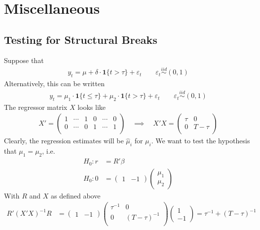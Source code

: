 \documentclass[12pt]{article}
\theoremstyle{plain}
\theoremstyle{definition}
\theoremstyle{remark}
\newcommand{\iid}{\overset{iid}{\sim}}
\begin{document}
\clearpage
\section{Miscellaneous}

\subsection{Testing for Structural Breaks}

Suppose that
\begin{align*}
  y_t = \mu + \delta \cdot \mathbf{1}\{t>\tau\} + \varepsilon_t
  \qquad \varepsilon_t \iid(0,1)
\end{align*}
Alternatively, this can be written
\begin{align*}
  y_t = \mu_1\cdot \mathbf{1}\{t\leq\tau\}
  + \mu_2 \cdot \mathbf{1}\{t>\tau\} + \varepsilon_t
  \qquad \varepsilon_t \iid(0,1)
\end{align*}
The regressor matrix $X$ looks like
\begin{align*}
  X' =
  \begin{pmatrix}
    1 & \cdots & 1 & 0 & \cdots & 0 \\
    0 & \cdots & 0 & 1 & \cdots & 1 \\
  \end{pmatrix}
  \quad\implies\quad
  X'X =
  \begin{pmatrix}
    \tau & 0 \\
    0 & T-\tau\\
  \end{pmatrix}
\end{align*}
Clearly, the regression estimates will be $\hat{\mu}_i$ for $\mu_i$.
We want to test the hypothesis that $\mu_1=\mu_2$, i.e.
\begin{align*}
  H_0: r &= R'\beta \\
  H_0: 0 &=
  \begin{pmatrix}
    1 & -1
  \end{pmatrix}
  \begin{pmatrix}
    \mu_1 \\ \mu_2
  \end{pmatrix}
\end{align*}
With $R$ and $X$ as defined above
\begin{align*}
  R'(X'X)^{-1}R
  &=
  \begin{pmatrix}
    1 & -1
  \end{pmatrix}
  \begin{pmatrix}
    \tau^{-1} & 0 \\
    0 & (T-\tau)^{-1}\\
  \end{pmatrix}
  \begin{pmatrix}
    1 \\ -1
  \end{pmatrix}
  = \tau^{-1} + (T-\tau)^{-1}
\end{align*}
\end{document}
